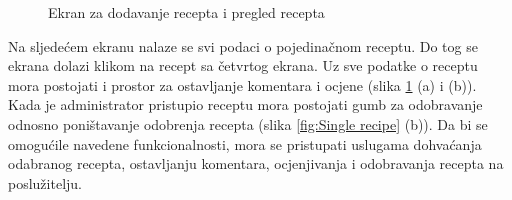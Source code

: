 \documentclass[times, utf8, zavrsni]{fer}
\begin{document}
\begin{figure}[h]
      \caption{Ekran za dodavanje recepta i pregled recepta}
      \label{fig:New recipe}
\end{figure}\newpage
Na sljedećem ekranu nalaze se svi podaci o pojedinačnom receptu. Do tog se ekrana dolazi klikom na recept
sa četvrtog ekrana. Uz sve podatke o receptu mora postojati i prostor za ostavljanje komentara i ocjene (slika \ref*{fig:New recipe} (a) i (b)).
Kada
je administrator pristupio receptu mora postojati gumb za odobravanje odnosno poništavanje odobrenja recepta (slika \ref*{fig:Single recipe} (b)).
Da bi se omogućile navedene funkcionalnosti, mora se pristupati uslugama dohvaćanja odabranog recepta,
ostavljanju komentara, ocjenjivanja i odobravanja recepta na poslužitelju.\\
\end{document}
